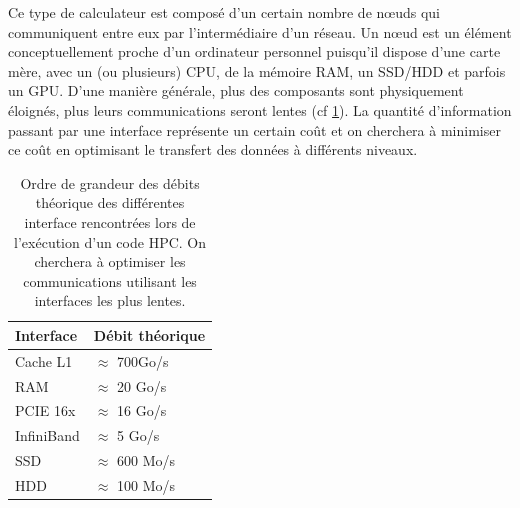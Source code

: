 Ce type de calculateur est composé d'un certain nombre de nœuds qui communiquent entre eux par l'intermédiaire d'un réseau.
Un nœud est un élément conceptuellement proche d'un ordinateur personnel puisqu'il dispose d'une carte mère, avec un (ou plusieurs) \ac{CPU}, de la mémoire RAM, un \ac{SSD}/\ac{HDD} et parfois un \ac{GPU}.
D'une manière générale, plus des composants sont physiquement éloignés, plus leurs communications seront lentes (cf \ref{tab:debits}).
La quantité d'information passant par une interface représente un certain coût et on cherchera à minimiser ce coût en optimisant le transfert des données à différents niveaux.

\begin{table}
\begin{tabular}{ l l }
\hline 
Interface  & Débit théorique \\
\hline 
Cache L1 & $\approx$ 700Go/s \\
RAM & $\approx$ 20 Go/s \\ 
PCIE 16x & $\approx$ 16 Go/s \\
InfiniBand & $\approx$ 5 Go/s \\
SSD & $\approx$ 600 Mo/s \\
HDD & $\approx$ 100 Mo/s
\end{tabular} 
\caption[Débits interfaces HPC]{Ordre de grandeur des débits théorique des différentes interface rencontrées lors de l'exécution d'un code \ac{HPC}.
On cherchera à optimiser les communications utilisant les interfaces les plus lentes.}
\label{tab:debits}
\end{table}



%

